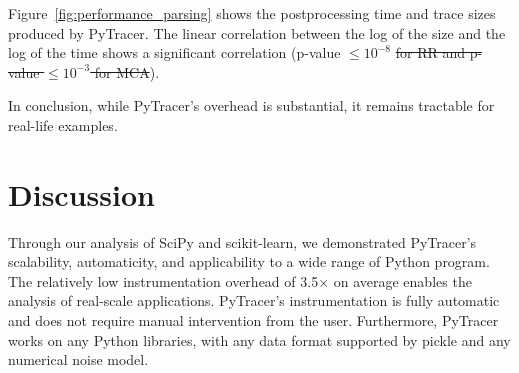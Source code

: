 \documentclass[10pt,journal,compsoc]{IEEEtran}
\newcommand{\pytracer}[0]{PyTracer\xspace}
\DeclareRobustCommand{\remove}[1]{\textcolor{lightred}{\sout{#1}}}
\DeclareRobustCommand{\remove}[1]{}
\begin{document}

Figure~\ref{fig:performance_parsing} shows the postprocessing time and trace
sizes produced by \pytracer. The linear correlation between the log of the size
and the log of the time shows a significant correlation (p-value $\leq 10^{-8}$
\remove{for RR and p-value $\leq 10^{-3}$ for MCA}).

In conclusion, while \pytracer's overhead is substantial, it remains tractable
for real-life examples.

\section{Discussion}



Through our analysis of SciPy and scikit-learn, we demonstrated \pytracer's
scalability, automaticity, and applicability to a wide range of Python program.
The relatively low instrumentation overhead of 3.5$\times$ on average enables
the analysis of real-scale applications. \pytracer's instrumentation is fully
automatic and does not require manual intervention from the user. Furthermore,
\pytracer works on any Python libraries, with any data format supported by
pickle and any numerical noise model.
\end{document}
